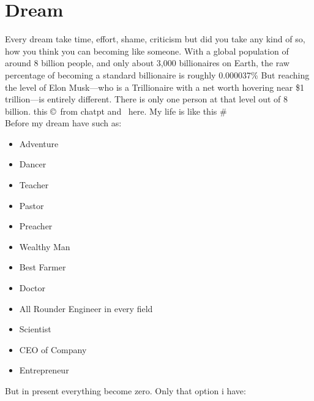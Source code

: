 \documentclass{article}%
\begin{document}
\section{Dream} %
Every dream take time, effort, shame, criticism but did you take any kind of so, how you think you can becoming like someone. With a global population of around 8 billion people, and only about 3,000 billionaires on Earth, the raw percentage of becoming a standard billionaire is roughly 0.000037\% But reaching the level of Elon Musk—who is a Trillionaire with a net worth hovering near \$1 trillion—is entirely different. There is only one person at that level out of 8 billion. this \copyright \ from chatpt and \textregistered \ here. My life is like this \# \\
Before my dream have such as:
\begin{itemize} %
    \item Adventure
    \item Dancer
    \item Teacher
    \item Pastor
    \item Preacher
    \item Wealthy Man
    \item Best Farmer
    \item Doctor
    \item All Rounder Engineer in every field
    \item Scientist
    \item CEO of Company
    \item Entrepreneur 
\end{itemize}
But in present everything become zero. Only that option i have:
\end{document}

